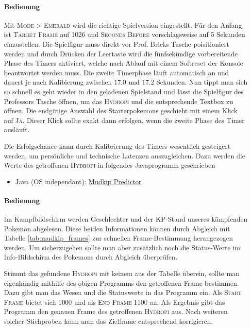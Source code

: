 \documentclass[11pt,a4paper,titlepage]{article}
\begin{document}
\paragraph{Bedienung}
Mit \textsc{Mode > Emerald} wird die richtige Spielversion eingestellt. Für den Anfang ist \textsc{Target Frame} auf 1026 und \textsc{Seconds Before} vorschlagsweise auf 5 Sekunden einzustellen. Die Spielfigur muss direkt vor Prof. Bricks Tasche poisitioniert werden und durch Drücken der Leertaste wird die fünfsekündige vorbereitende Phase des Timers aktiviert, welche nach Ablauf mit einem Softreset der Konsole beantwortet werden muss. Die zweite Timerphase läuft automatisch an und dauert je nach Kalibierung zwischen $17.0$ und $17.2$ Sekunden. Nun tippt man sich so schnell es geht wieder in den geladenen Spielstand und lässt die Spielfigur des Professors Tasche öffnen, um das \textsc{Hydropi} und die entsprechende Textbox zu öffnen. Die endgütige Auswahl des Starterpokemons geschieht mit einem Klick auf \textsc{Ja}. Dieser Klick sollte exakt dann erfolgen, wenn die zweite Phase des Timer ausläuft.

Die Erfolgschance kann durch Kalibrierung des Timers wesentlich gesteigert werden, um persönliche und technische Latenzen auszugleichen. Dazu werden die Werte des getroffenen \textsc{Hydropi} in folgendes Javaprogramm geschrieben

\begin{itemize}
\item Java (OS independant): \href{https://www.speedrun.com/tools/MudkipPredictorv4_thv6k.jar}{Mudkip Predictor}
\end{itemize}

\paragraph{Bedienung}
Im Kampfbildschirm werden Geschlechter und der KP-Stand unseres kämpfenden Pokemon abgelesen. Diese beiden Informationen können durch Abgleich mit Tabelle \ref{tab:mudkip_frames} zur schnellen Frame-Bestimmung herangezogen werden. Um sicherzugehen sollte man aber zusätzlich noch die Status-Werte im Info-Bildschirm des Pokemons durch Abgleich überprüfen.

Stimmt das gefundene \textsc{Hydropi} mit keinem aus der Tabelle überein, sollte man eigenhändig mithilfe des obigen Programms den getroffenen Frame bestimmen. Dazu gibt man das Wesen und die Statuswerte in das Programm ein. Als \textsc{Start Frame} bietet sich 1000 und als \textsc{End Frame} 1100 an. Als Ergebnis gibt das Programm den genauen Frame des getroffenen \textsc{Hydropi} aus. Nach weiteren solcher Stichproben kann man das Zielframe entsprechend korrigieren.
\end{document}
